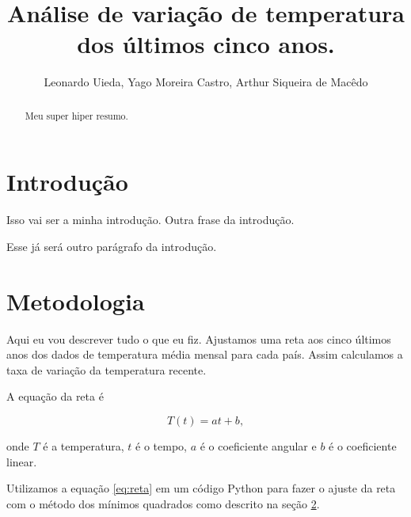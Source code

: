 \documentclass{article}
\begin{document}
\title{Análise de variação de temperatura dos últimos cinco anos.}
\author{Leonardo Uieda, Yago Moreira Castro, Arthur Siqueira de Macêdo}

\maketitle

\begin{abstract}
Meu super hiper resumo.

\end{abstract}

\section{Introdução}
Isso vai ser a minha introdução.
Outra frase da introdução.

Esse já será outro parágrafo da introdução.

\section{Metodologia}
\label{seq:metodologia}
Aqui eu vou descrever tudo o que eu fiz.
Ajustamos uma reta aos cinco últimos anos dos dados
de temperatura média mensal para cada país.
Assim calculamos a taxa de variação da temperatura recente.

A equação da reta é

\begin{equation}
T(t) = a t + b,
\label{eq:reta}
\end{equation}

\noindent
onde $T$ é a temperatura, $t$ é o tempo, 
$a$ é o coeficiente angular e $b$ é o coeficiente linear.

Utilizamos a equação \ref{eq:reta} em um código Python para fazer 
o ajuste da reta com o método dos mínimos quadrados como descrito na seção \ref{seq:metodologia}.
\end{document}
